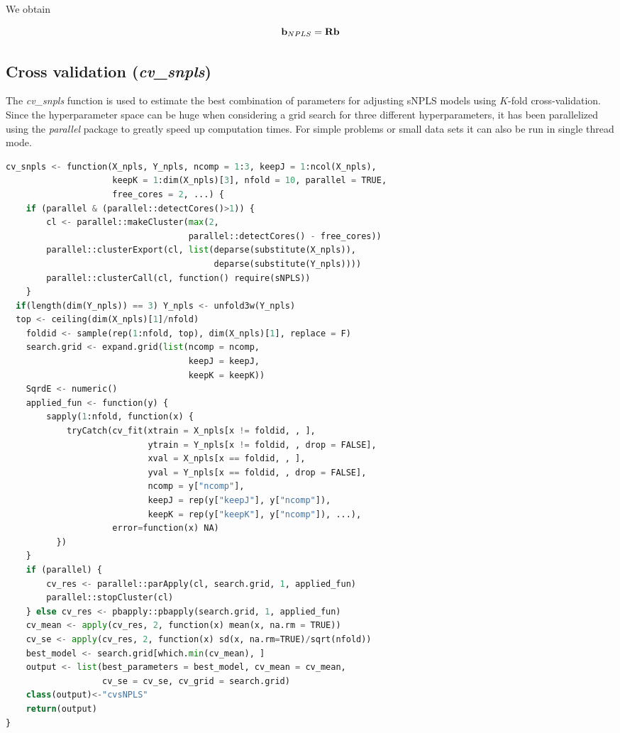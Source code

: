 We obtain

\begin{equation}
    \textbf{\text{b}}_{NPLS}=\textbf{\text{Rb}}
\end{equation}

\subsection{Cross validation (\textit{cv\_snpls})}
The \textit{cv\_snpls} function is used to estimate the best combination of parameters for adjusting sNPLS models using $K$-fold cross-validation. Since the hyperparameter space can be huge when considering a grid search for three different hyperparameters, it has been parallelized using the \textit{parallel} package to greatly speed up computation times. For simple problems or small data sets it can also be run in single thread mode.
\vspace{15pt}
\begin{scriptsize}
\begin{lstlisting}[language=Python, caption=Cross validation function]
cv_snpls <- function(X_npls, Y_npls, ncomp = 1:3, keepJ = 1:ncol(X_npls),
                     keepK = 1:dim(X_npls)[3], nfold = 10, parallel = TRUE, 
                     free_cores = 2, ...) {
    if (parallel & (parallel::detectCores()>1)) {
        cl <- parallel::makeCluster(max(2, 
                                    parallel::detectCores() - free_cores))
        parallel::clusterExport(cl, list(deparse(substitute(X_npls)),
                                         deparse(substitute(Y_npls))))
        parallel::clusterCall(cl, function() require(sNPLS))
    }
  if(length(dim(Y_npls)) == 3) Y_npls <- unfold3w(Y_npls)
  top <- ceiling(dim(X_npls)[1]/nfold)
    foldid <- sample(rep(1:nfold, top), dim(X_npls)[1], replace = F)
    search.grid <- expand.grid(list(ncomp = ncomp, 
                                    keepJ = keepJ, 
                                    keepK = keepK))
    SqrdE <- numeric()
    applied_fun <- function(y) {
        sapply(1:nfold, function(x) {
            tryCatch(cv_fit(xtrain = X_npls[x != foldid, , ],
                            ytrain = Y_npls[x != foldid, , drop = FALSE],
                            xval = X_npls[x == foldid, , ],
                            yval = Y_npls[x == foldid, , drop = FALSE],
                            ncomp = y["ncomp"],
                            keepJ = rep(y["keepJ"], y["ncomp"]),
                            keepK = rep(y["keepK"], y["ncomp"]), ...),
                     error=function(x) NA)
          })
    }
    if (parallel) {
        cv_res <- parallel::parApply(cl, search.grid, 1, applied_fun)
        parallel::stopCluster(cl)
    } else cv_res <- pbapply::pbapply(search.grid, 1, applied_fun)
    cv_mean <- apply(cv_res, 2, function(x) mean(x, na.rm = TRUE))
    cv_se <- apply(cv_res, 2, function(x) sd(x, na.rm=TRUE)/sqrt(nfold))
    best_model <- search.grid[which.min(cv_mean), ]
    output <- list(best_parameters = best_model, cv_mean = cv_mean,
                   cv_se = cv_se, cv_grid = search.grid)
    class(output)<-"cvsNPLS"
    return(output)
}
\end{lstlisting}
\end{scriptsize}

